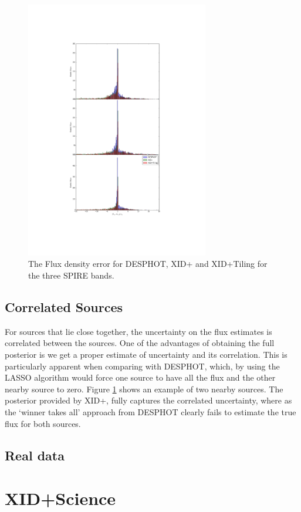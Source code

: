 \documentclass[useAMS,usenatbib]{mn2e}
\begin{document}
\begin{figure}
\includegraphics[width=8cm]{./Figures/Flux_density_error}
\caption{The Flux density error for DESPHOT, XID+ and XID+Tiling for the three SPIRE bands.}\label{Fig:flux_density_error}
\end{figure}

\subsection{Correlated Sources}
For sources that lie close together, the uncertainty on the flux estimates is correlated between the sources. One of the advantages of obtaining the full posterior is we get a proper estimate of uncertainty and its correlation. This is particularly apparent when comparing with DESPHOT, which, by using the LASSO algorithm would force one source to have all the flux and the other nearby source to zero. Figure \ref{} shows an example of two nearby sources. The posterior provided by XID+, fully captures the correlated uncertainty, where as the `winner takes all' approach from DESPHOT clearly fails to estimate the true flux for both sources.

\subsection{Real data}




\section{XID+Science}
\end{document}
